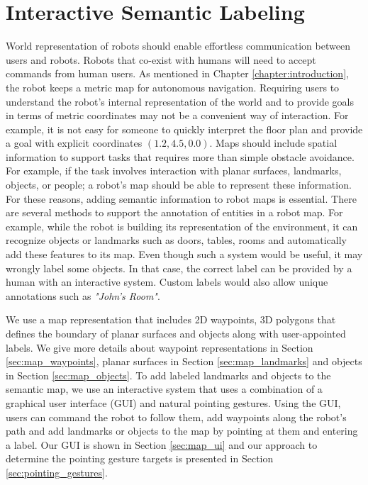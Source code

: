 \chapter{Interactive Semantic Labeling}
\label{chapter:map_annotation}

World representation of robots should enable effortless communication between users and robots. Robots that co-exist with humans will need to accept commands from human users. As mentioned in Chapter \ref{chapter:introduction}, the robot keeps a metric map for autonomous navigation. Requiring users to understand the robot's internal representation of the world and to provide goals in terms of metric coordinates may not be a convenient way of interaction. For example, it is not easy for someone to quickly interpret the floor plan and provide a goal with explicit coordinates $(1.2,4.5,0.0)$. Maps should include spatial information to support tasks that requires more than simple obstacle avoidance. For example, if the task involves interaction with planar surfaces, landmarks, objects, or people; a robot's map should be able to represent these information. For these reasons, adding semantic information to robot maps is essential. There are several methods to support the annotation of entities in a robot map. For example, while the robot is building its representation of the environment, it can recognize objects or landmarks such as doors, tables, rooms and automatically add these features to its map. Even though such a system would be useful, it may wrongly label some objects. In that case, the correct label can be provided by a human with an interactive system. Custom labels would also allow unique annotations such as \textit{"John's Room"}.

We use a map representation that includes 2D waypoints, 3D polygons that defines the boundary of planar surfaces and objects along with user-appointed labels. We give more details about waypoint representations in Section \ref{sec:map_waypoints}, planar surfaces in Section \ref{sec:map_landmarks} and objects in Section \ref{sec:map_objects}. To add labeled landmarks and objects to the semantic map, we use an interactive system that uses a combination of a graphical user interface (GUI) and natural pointing gestures. Using the GUI, users can command the robot to follow them, add waypoints along the robot's path and add landmarks or objects to the map by pointing at them and entering a label. Our GUI is shown in Section \ref{sec:map_ui} and our approach to determine the pointing gesture targets is presented in Section \ref{sec:pointing_gestures}.

